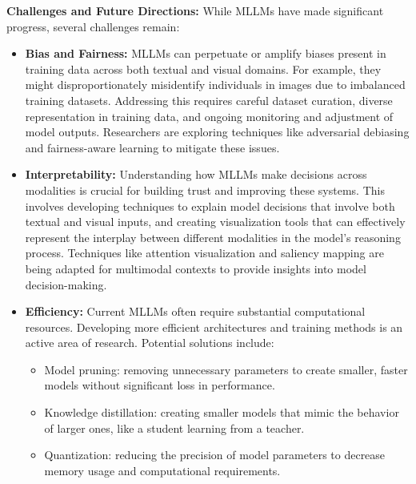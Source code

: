 \textbf{Challenges and Future Directions:}
While MLLMs have made significant progress, several challenges remain:

\begin{itemize}
    \item \textbf{Bias and Fairness:} MLLMs can perpetuate or amplify biases present in training data across both textual and visual domains. For example, they might disproportionately misidentify individuals in images due to imbalanced training datasets. Addressing this requires careful dataset curation, diverse representation in training data, and ongoing monitoring and adjustment of model outputs. Researchers are exploring techniques like adversarial debiasing and fairness-aware learning to mitigate these issues.
    
    \item \textbf{Interpretability:} Understanding how MLLMs make decisions across modalities is crucial for building trust and improving these systems. This involves developing techniques to explain model decisions that involve both textual and visual inputs, and creating visualization tools that can effectively represent the interplay between different modalities in the model's reasoning process. Techniques like attention visualization and saliency mapping are being adapted for multimodal contexts to provide insights into model decision-making.
    
    \item \textbf{Efficiency:} Current MLLMs often require substantial computational resources. Developing more efficient architectures and training methods is an active area of research. Potential solutions include:
    \begin{itemize}
        \item Model pruning: removing unnecessary parameters to create smaller, faster models without significant loss in performance.
        \item Knowledge distillation: creating smaller models that mimic the behavior of larger ones, like a student learning from a teacher.
        \item Quantization: reducing the precision of model parameters to decrease memory usage and computational requirements.
    \end{itemize}
    

\end{itemize}
